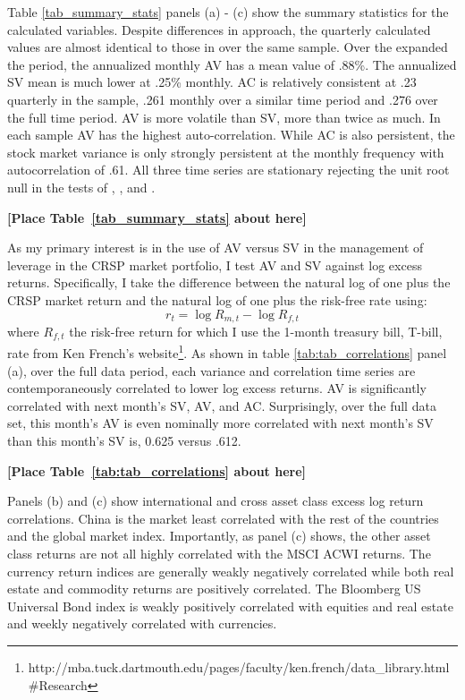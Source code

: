 Table \ref{tab_summary_stats} panels (a) - (c) show the summary statistics for the calculated variables. Despite differences in approach, the quarterly calculated values are almost identical to those in \citet{pollet_average_2010} over the same sample. Over the expanded the period, the annualized monthly AV has a mean value of .88\%. The annualized SV mean is much lower at .25\% monthly. AC is relatively consistent at .23 quarterly in the \cite{pollet_average_2010} sample, .261 monthly over a similar time period and .276 over the full time period. AV is more volatile than SV, more than twice as much. In each sample AV has the highest auto-correlation. While AC is also persistent, the stock market variance is only strongly persistent at the monthly frequency with autocorrelation of .61. All three time series are stationary rejecting the unit root null in the tests of \citet{dickey_distribution_1979}, \citet{Ng2001}, and \citet{ers1996}. 
\bigskip
\centerline{\bf [Place Table~\ref{tab_summary_stats} about here]}
\bigskip

As my primary interest is in the use of AV versus SV in the management of leverage in the CRSP market portfolio, I test AV and SV against log excess returns.
Specifically, I take the difference between the natural log of one plus the CRSP market return and the natural log of one plus the risk-free rate using:
\begin{equation}
	r_{t} = \log R_{m,t} - \log R_{f,t} 
\end{equation}
where $R_{f,t}$ the risk-free return for which I use the 1-month treasury bill, T-bill, rate from Ken French's website\footnote{http://mba.tuck.dartmouth.edu/pages/faculty/ken.french/data\_library.html\#Research}. As shown in table \ref{tab:tab_correlations} panel (a), over the full data period, each variance and correlation time series are contemporaneously correlated to lower log excess returns. AV is significantly correlated with next month's SV, AV, and AC. Surprisingly, over the full data set, this month's AV is even nominally more correlated with next month's SV than this month's SV is, 0.625 versus .612.%
\bigskip
\centerline{\bf [Place Table~\ref{tab:tab_correlations} about here]}
\bigskip

Panels (b) and (c) show international and cross asset class excess log return correlations. China is the market least correlated with the rest of the countries and the global market index. Importantly, as panel (c) shows, the other asset class returns are not all highly correlated with the MSCI ACWI returns. The currency return indices are generally weakly negatively correlated while both real estate and commodity returns are positively correlated. The Bloomberg US Universal Bond index is weakly positively correlated with equities and real estate and weekly negatively correlated with currencies.

